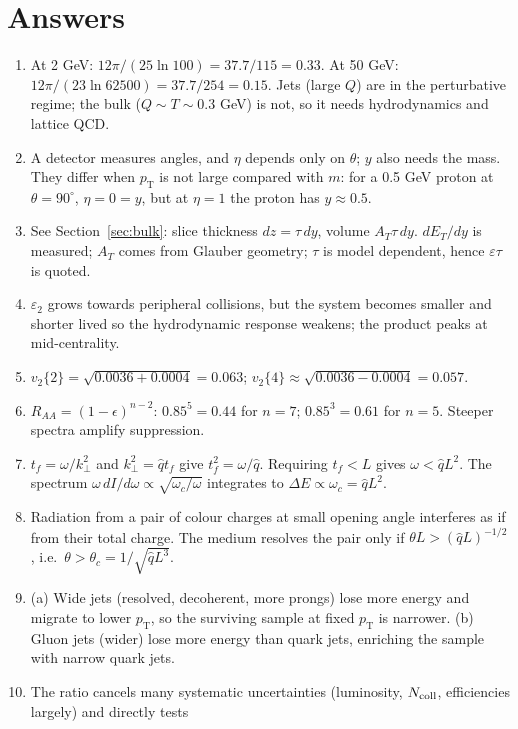 \documentclass[11pt,letterpaper]{article}
\newcommand{\pT}{p_{\mathrm{T}}}
\newcommand{\RAA}{R_{AA}}
\begin{document}
\appendix
\section{Answers}\label{app:answers}
\begin{enumerate}[label=A\arabic*.]
\item At 2 GeV: $12\pi/(25\ln100)=37.7/115=0.33$. At 50 GeV: $12\pi/(23\ln62500)=37.7/254=0.15$. Jets (large $Q$) are in the
perturbative regime; the bulk ($Q\sim T\sim0.3$ GeV) is not, so it needs hydrodynamics and lattice QCD.
\item A detector measures angles, and $\eta$ depends only on $\theta$; $y$ also needs the mass. They differ when $\pT$ is not
large compared with $m$: for a 0.5 GeV proton at $\theta=90^\circ$, $\eta=0=y$, but at $\eta=1$ the proton has $y\approx0.5$.
\item See Section~\ref{sec:bulk}: slice thickness $dz=\tau\,dy$, volume $A_T\tau\,dy$. $dE_T/dy$ is measured; $A_T$ comes from
Glauber geometry; $\tau$ is model dependent, hence $\varepsilon\tau$ is quoted.
\item $\varepsilon_2$ grows towards peripheral collisions, but the system becomes smaller and shorter lived so the
hydrodynamic response weakens; the product peaks at mid-centrality.
\item $v_2\{2\}=\sqrt{0.0036+0.0004}=0.063$; $v_2\{4\}\approx\sqrt{0.0036-0.0004}=0.057$.
\item $\RAA=(1-\epsilon)^{n-2}$: $0.85^5=0.44$ for $n=7$; $0.85^3=0.61$ for $n=5$. Steeper spectra amplify suppression.
\item $t_f=\omega/k_\perp^2$ and $k_\perp^2=\hat qt_f$ give $t_f^2=\omega/\hat q$. Requiring $t_f<L$ gives $\omega<\hat qL^2$.
The spectrum $\omega\,dI/d\omega\propto\sqrt{\omega_c/\omega}$ integrates to $\Delta E\propto\omega_c=\hat qL^2$.
\item Radiation from a pair of colour charges at small opening angle interferes as if from their total charge. The medium
resolves the pair only if $\theta L>(\hat qL)^{-1/2}$, i.e.\ $\theta>\theta_c=1/\sqrt{\hat qL^3}$.
\item (a) Wide jets (resolved, decoherent, more prongs) lose more energy and migrate to lower $\pT$, so the surviving sample
at fixed $\pT$ is narrower. (b) Gluon jets (wider) lose more energy than quark jets, enriching the sample with narrow quark jets.
\item The ratio cancels many systematic uncertainties (luminosity, $N_{\rm coll}$, efficiencies largely) and directly tests

\end{enumerate}
\end{document}
